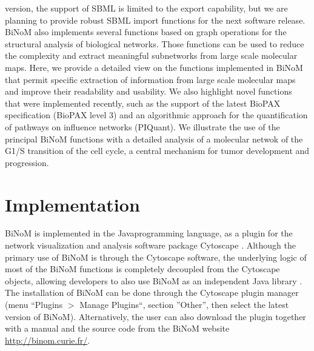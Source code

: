 \documentclass[10pt]{bmc_article}
\newenvironment{bmcformat}{\baselineskip20pt\sloppy\setboolean{publ}{false}}{\baselineskip20pt\sloppy}
\begin{document}
\begin{bmcformat}
version, the support of SBML is limited to the export capability, but we are
planning to provide robust SBML import functions for the next software release. 
BiNoM also implements several functions based on graph operations for the structural analysis of
biological networks. Those functions can be used to reduce the complexity and
extract meaningful subnetworks from large scale molecular maps. Here, we provide
a detailed view on the functions implemented in BiNoM
that permit specific extraction of information from large scale molecular maps
and improve their readability and usability. We also highlight novel functions
that were implemented recently, such as the support of the latest BioPAX
specification (BioPAX level 3) and an algorithmic approach for the
quantification of pathways on influence networks (PIQuant). We illustrate the
use of the principal BiNoM functions with a detailed analysis of a molecular
netwok of the G1/S transition of the cell cycle, a central mechanism
for tumor development and progression.

\section*{Implementation}
BiNoM is implemented in the Java\texttrademark programming language, as a plugin
for the network visualization and analysis software package Cytoscape
\cite{cline2007integration}. Although the primary use of BiNoM is through the
Cytoscape software, the underlying logic of most of the BiNoM functions is completely
decoupled from the Cytoscape objects, allowing developers to also use BiNoM as
an independent Java library \cite{zinovyev2008binom}. The installation of BiNoM
can be done through the Cytoscape plugin manager (menu ``Plugins $>$ Manage
Plugins``, section ''Other'', then select the latest version of BiNoM). Alternatively, the user can
also download the plugin together with a manual and the source code from the
BiNoM website \url{http://binom.curie.fr/}. 


\end{bmcformat}
\end{document}

